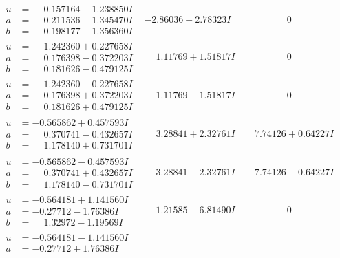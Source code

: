 \documentclass[1p]{elsarticle_modified}
\theoremstyle{definition}
\begin{document}
$$\begin{array}{c|c|c}
\begin{aligned}
u &= \phantom{-}0.157164 - 1.238850 I \\
a &= \phantom{-}0.211536 - 1.345470 I \\
b &= \phantom{-}0.198177 - 1.356360 I\end{aligned}
 & -2.86036 - 2.78323 I & \phantom{-0.000000 } 0 \\ \hline\begin{aligned}
u &= \phantom{-}1.242360 + 0.227658 I \\
a &= \phantom{-}0.176398 - 0.372203 I \\
b &= \phantom{-}0.181626 - 0.479125 I\end{aligned}
 & \phantom{-}1.11769 + 1.51817 I & \phantom{-0.000000 } 0 \\ \hline\begin{aligned}
u &= \phantom{-}1.242360 - 0.227658 I \\
a &= \phantom{-}0.176398 + 0.372203 I \\
b &= \phantom{-}0.181626 + 0.479125 I\end{aligned}
 & \phantom{-}1.11769 - 1.51817 I & \phantom{-0.000000 } 0 \\ \hline\begin{aligned}
u &= -0.565862 + 0.457593 I \\
a &= \phantom{-}0.370741 - 0.432657 I \\
b &= \phantom{-}1.178140 + 0.731701 I\end{aligned}
 & \phantom{-}3.28841 + 2.32761 I & \phantom{-}7.74126 + 0.64227 I \\ \hline\begin{aligned}
u &= -0.565862 - 0.457593 I \\
a &= \phantom{-}0.370741 + 0.432657 I \\
b &= \phantom{-}1.178140 - 0.731701 I\end{aligned}
 & \phantom{-}3.28841 - 2.32761 I & \phantom{-}7.74126 - 0.64227 I \\ \hline\begin{aligned}
u &= -0.564181 + 1.141560 I \\
a &= -0.27712 - 1.76386 I \\
b &= \phantom{-}1.32972 - 1.19569 I\end{aligned}
 & \phantom{-}1.21585 - 6.81490 I & \phantom{-0.000000 } 0 \\ \hline\begin{aligned}
u &= -0.564181 - 1.141560 I \\
a &= -0.27712 + 1.76386 I \\

\end{aligned}
\end{array}$$
\end{document}
